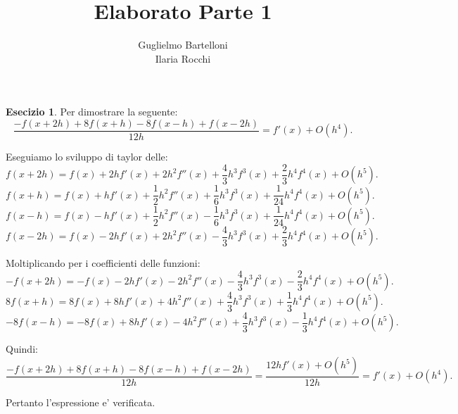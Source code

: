 \documentclass[11pt]{article}
\theoremstyle{definition}
\newtheorem{exer}{Esecizio}
\theoremstyle{plain}
\begin{document}
\title{Elaborato Parte 1}
\author{Guglielmo Bartelloni\\Ilaria Rocchi}
\maketitle

\thispagestyle{empty}

\begin{exer}
Per dimostrare la seguente:
\[
	\frac{-f(x+2h)+8f(x+h)-8f(x-h)+f(x-2h)}{12h}=f'(x)+O(h^{4})
.\] 

Eseguiamo lo sviluppo di taylor delle:
\[
	f(x+2h)=f(x)+2hf'(x)+2h^{2}f''(x)+\frac{4}{3}h^{3}f^{3}(x)+\frac{2}{3}h^{4}f^{4}(x)+O(h^{5})
.\] 
\[
	f(x+h)=f(x)+hf'(x)+\frac{1}{2}h^{2}f''(x)+\frac{1}{6}h^{3}f^{3}(x)+\frac{1}{24}h^{4}f^{4}(x)+O(h^{5})
.\] 
\[
	f(x-h)=f(x)-hf'(x)+\frac{1}{2}h^{2}f''(x)-\frac{1}{6}h^{3}f^{3}(x)+\frac{1}{24}h^{4}f^{4}(x)+O(h^{5})
.\] 
\[
	f(x-2h)=f(x)-2hf'(x)+2h^{2}f''(x)-\frac{4}{3}h^{3}f^{3}(x)+\frac{2}{3}h^{4}f^{4}(x)+O(h^{5})
.\] 

Moltiplicando per i coefficienti delle funzioni:
\[
	-f(x+2h)=-f(x)-2hf'(x)-2h^{2}f''(x)-\frac{4}{3}h^{3}f^{3}(x)-\frac{2}{3}h^{4}f^{4}(x)+O(h^{5})
.\] 
\[
	8f(x+h)=8f(x)+8hf'(x)+4h^{2}f''(x)+\frac{4}{3}h^{3}f^{3}(x)+\frac{1}{3}h^{4}f^{4}(x)+O(h^{5})
.\] 
\[
	-8f(x-h)=-8f(x)+8hf'(x)-4h^{2}f''(x)+\frac{4}{3}h^{3}f^{3}(x)-\frac{1}{3}h^{4}f^{4}(x)+O(h^{5})
.\] 

Quindi:
\[
	\frac{-f(x+2h)+8f(x+h)-8f(x-h)+f(x-2h)}{12h}=\frac{12hf'(x)+O(h^{5})}{12h}=f'(x)+O(h^{4})
.\] 

Pertanto l'espressione e' verificata.
\end{exer}
\end{document}
